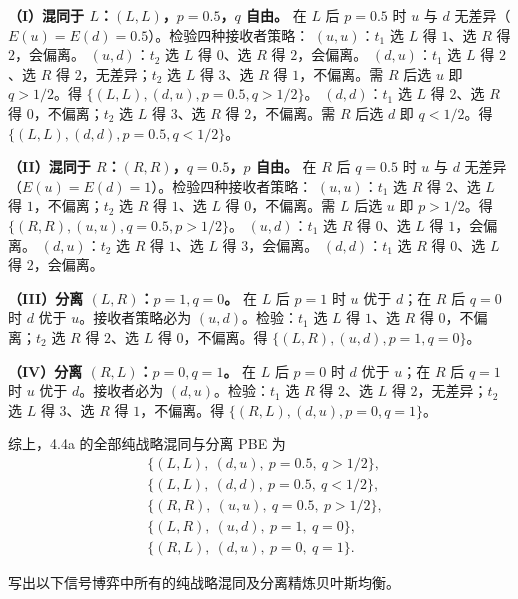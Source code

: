 \textbf{（I）混同于 $L$：$(L,L)$，$p=0.5$，$q$ 自由。} 在 $L$ 后 $p=0.5$ 时 $u$ 与 $d$ 无差异（$E(u)=E(d)=0.5$）。检验四种接收者策略：
$(u,u)$：$t_1$ 选 $L$ 得 $1$、选 $R$ 得 $2$，会偏离。
$(u,d)$：$t_2$ 选 $L$ 得 $0$、选 $R$ 得 $2$，会偏离。
$(d,u)$：$t_1$ 选 $L$ 得 $2$、选 $R$ 得 $2$，无差异；$t_2$ 选 $L$ 得 $3$、选 $R$ 得 $1$，不偏离。需 $R$ 后选 $u$ 即 $q>1/2$。得 $\{(L,L),(d,u),p=0.5,q>1/2\}$。
$(d,d)$：$t_1$ 选 $L$ 得 $2$、选 $R$ 得 $0$，不偏离；$t_2$ 选 $L$ 得 $3$、选 $R$ 得 $2$，不偏离。需 $R$ 后选 $d$ 即 $q<1/2$。得 $\{(L,L),(d,d),p=0.5,q<1/2\}$。

\textbf{（II）混同于 $R$：$(R,R)$，$q=0.5$，$p$ 自由。} 在 $R$ 后 $q=0.5$ 时 $u$ 与 $d$ 无差异（$E(u)=E(d)=1$）。检验四种接收者策略：
$(u,u)$：$t_1$ 选 $R$ 得 $2$、选 $L$ 得 $1$，不偏离；$t_2$ 选 $R$ 得 $1$、选 $L$ 得 $0$，不偏离。需 $L$ 后选 $u$ 即 $p>1/2$。得 $\{(R,R),(u,u),q=0.5,p>1/2\}$。
$(u,d)$：$t_1$ 选 $R$ 得 $0$、选 $L$ 得 $1$，会偏离。
$(d,u)$：$t_2$ 选 $R$ 得 $1$、选 $L$ 得 $3$，会偏离。
$(d,d)$：$t_1$ 选 $R$ 得 $0$、选 $L$ 得 $2$，会偏离。

\textbf{（III）分离 $(L,R)$：$p=1,q=0$。} 在 $L$ 后 $p=1$ 时 $u$ 优于 $d$；在 $R$ 后 $q=0$ 时 $d$ 优于 $u$。接收者策略必为 $(u,d)$。检验：$t_1$ 选 $L$ 得 $1$、选 $R$ 得 $0$，不偏离；$t_2$ 选 $R$ 得 $2$、选 $L$ 得 $0$，不偏离。得 $\{(L,R),(u,d),p=1,q=0\}$。

\textbf{（IV）分离 $(R,L)$：$p=0,q=1$。} 在 $L$ 后 $p=0$ 时 $d$ 优于 $u$；在 $R$ 后 $q=1$ 时 $u$ 优于 $d$。接收者必为 $(d,u)$。检验：$t_1$ 选 $R$ 得 $2$、选 $L$ 得 $2$，无差异；$t_2$ 选 $L$ 得 $3$、选 $R$ 得 $1$，不偏离。得 $\{(R,L),(d,u),p=0,q=1\}$。

综上，4.4a 的全部纯战略混同与分离 PBE 为
\[
  \begin{aligned}
    &\bigl\{(L,L),\ (d,u),\ p=0.5,\ q>1/2\bigr\},\\
    &\bigl\{(L,L),\ (d,d),\ p=0.5,\ q<1/2\bigr\},\\
    &\bigl\{(R,R),\ (u,u),\ q=0.5,\ p>1/2\bigr\},\\
    &\bigl\{(L,R),\ (u,d),\ p=1,\ q=0\bigr\},\\
    &\bigl\{(R,L),\ (d,u),\ p=0,\ q=1\bigr\}.
  \end{aligned}
\]

写出以下信号博弈中所有的纯战略混同及分离精炼贝叶斯均衡。

